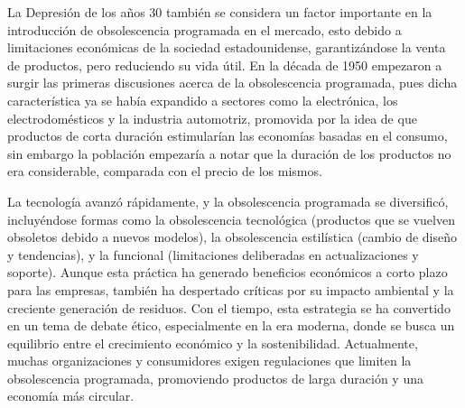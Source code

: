 \documentclass[10pt,journal,compsoc]{IEEEtran}
\begin{document}
La Depresión de los años 30 también se considera un factor importante en la introducción de obsolescencia programada en el mercado, esto debido a limitaciones económicas de la sociedad estadounidense, garantizándose la venta de productos, pero reduciendo su vida útil. En la década de 1950 empezaron a surgir las primeras discusiones acerca de la obsolescencia programada, pues dicha característica ya se había expandido a sectores como la electrónica, los electrodomésticos y la industria automotriz, promovida por la idea de que productos de corta duración estimularían las economías basadas en el consumo, sin embargo la población empezaría a notar que la duración de los productos no era considerable, comparada con el precio de los mismos.

La tecnología avanzó rápidamente, y la obsolescencia programada se diversificó, incluyéndose formas como la obsolescencia tecnológica (productos que se vuelven obsoletos debido a nuevos modelos), la obsolescencia estilística (cambio de diseño y tendencias), y la funcional (limitaciones deliberadas en actualizaciones y soporte)\cite{maycroft2009consumption}. Aunque esta práctica ha generado beneficios económicos a corto plazo para las empresas, también ha despertado críticas por su impacto ambiental y la creciente generación de residuos. Con el tiempo, esta estrategia se ha convertido en un tema de debate ético, especialmente en la era moderna, donde se busca un equilibrio entre el crecimiento económico y la sostenibilidad. Actualmente, muchas organizaciones y consumidores exigen regulaciones que limiten la obsolescencia programada, promoviendo productos de larga duración y una economía más circular.

\end{document}
